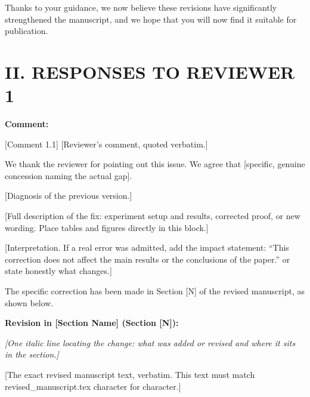 \documentclass[11pt]{article}
\newenvironment{commentblock}[1][Comment]{%
  \par\noindent\textbf{#1:} %
}{\par}
\begin{document}
\vspace{0.5cm}

Thanks to your guidance, we now believe these revisions have significantly strengthened the manuscript, and we hope that you will now find it suitable for publication.

\newpage


\section*{II. RESPONSES TO REVIEWER 1}


\begin{commentblock}
[Comment 1.1] [Reviewer's comment, quoted verbatim.]
\end{commentblock}

\begin{responseblock}
We thank the reviewer for pointing out this issue. We agree that [specific, genuine concession naming the actual gap].

[Diagnosis of the previous version.]

[Full description of the fix: experiment setup and results, corrected proof, or new wording. Place tables and figures directly in this block.]

[Interpretation. If a real error was admitted, add the impact statement: ``This correction does not affect the main results or the conclusions of the paper.'' or state honestly what changes.]

The specific correction has been made in Section [N] of the revised manuscript, as shown below.
\end{responseblock}

\begin{revisedblock}
\textbf{Revision in [Section Name] (Section [N]):}

\textit{[One italic line locating the change: what was added or revised and where it sits in the section.]}

[The exact revised manuscript text, verbatim. This text must match revised\_manuscript.tex character for character.]
\end{revisedblock}
\end{document}
